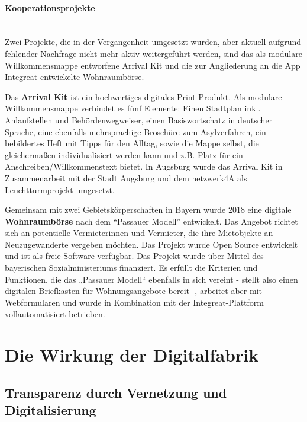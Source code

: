 \documentclass[12pt, a4paper]{article} %
\begin{document}
\hypertarget{kooperationsprojekte}{%
\paragraph{Kooperationsprojekte}\label{kooperationsprojekte}}\mbox{} \\

Zwei Projekte, die in der Vergangenheit umgesetzt wurden, aber aktuell
aufgrund fehlender Nachfrage nicht mehr aktiv weitergeführt werden, sind
das als modulare Willkommensmappe entworfene Arrival Kit und die zur
Angliederung an die App Integreat entwickelte Wohnraumbörse.

Das \textbf{Arrival Kit} ist ein hochwertiges digitales Print-Produkt.
Als modulare Willkommensmappe verbindet es fünf Elemente: Einen
Stadtplan inkl. Anlaufstellen und Behördenwegweiser, einen
Basiswortschatz in deutscher Sprache, eine ebenfalls mehrsprachige
Broschüre zum Asylverfahren, ein bebildertes Heft mit Tipps für den
Alltag, sowie die Mappe selbst, die gleichermaßen individualisiert
werden kann und z.B. Platz für ein Anschreiben/Willkommenstext bietet.
In Augsburg wurde das Arrival Kit in Zusammenarbeit mit der Stadt
Augsburg und dem netzwerk4A als Leuchtturmprojekt umgesetzt.

Gemeinsam mit zwei Gebietskörperschaften in Bayern wurde 2018 eine
digitale \textbf{Wohnraumbörse} nach dem “Passauer Modell” entwickelt.
Das Angebot richtet sich an potentielle Vermieterinnen und Vermieter,
die ihre Mietobjekte an Neuzugewanderte vergeben möchten. Das Projekt
wurde Open Source entwickelt und ist als freie Software verfügbar. Das
Projekt wurde über Mittel des bayerischen Sozialministeriums finanziert.
Es erfüllt die Kriterien und Funktionen, die das „Passauer Modell“
ebenfalls in sich vereint - stellt also einen digitalen Briefkasten für
Wohnungsangebote bereit -, arbeitet aber mit Webformularen und wurde in
Kombination mit der Integreat-Plattform vollautomatisiert betrieben.

\hypertarget{die-wirkung-der-digitalfabrik}{%
\section{Die Wirkung der
Digitalfabrik}\label{die-wirkung-der-digitalfabrik}}

\hypertarget{transparenz-durch-vernetzung-und-digitalisierung}{%
\subsection{Transparenz durch Vernetzung und
Digitalisierung}\label{transparenz-durch-vernetzung-und-digitalisierung}}
\end{document}
